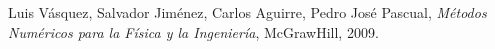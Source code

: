 

\begin{thebibliography}{9}
Luis Vásquez, Salvador Jiménez, Carlos Aguirre, Pedro José Pascual, \textit{Métodos Numéricos para la Física y la Ingeniería}, McGrawHill, 2009. 
 





\end{thebibliography}

